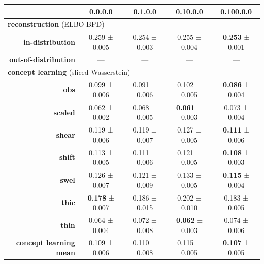 \begin{tabular}{rcccc}
\toprule
& \textbf{0.0.0.0} & \textbf{0.1.0.0} & \textbf{0.10.0.0} & \textbf{0.100.0.0} \\
\midrule
\multicolumn{ 5 }{l}{\textbf{reconstruction}  (ELBO BPD)} \\
\midrule
\textbf{in-distribution} & 0.259 ± 0.005 & 0.254 ± 0.003 & 0.255 ± 0.004 & \textbf{0.253} ± 0.001 \\
\textbf{out-of-distribution} & --- & --- & --- & --- \\
\midrule
\multicolumn{ 5 }{l}{\textbf{concept learning}  (sliced Wasserstein)} \\
\midrule
\textbf{obs} & 0.099 ± 0.006 & 0.091 ± 0.006 & 0.102 ± 0.005 & \textbf{0.086} ± 0.004 \\
\textbf{scaled} & 0.062 ± 0.002 & 0.068 ± 0.005 & \textbf{0.061} ± 0.003 & 0.073 ± 0.004 \\
\textbf{shear} & 0.119 ± 0.006 & 0.119 ± 0.007 & 0.127 ± 0.005 & \textbf{0.111} ± 0.006 \\
\textbf{shift} & 0.113 ± 0.005 & 0.111 ± 0.006 & 0.121 ± 0.005 & \textbf{0.108} ± 0.003 \\
\textbf{swel} & 0.126 ± 0.007 & 0.121 ± 0.009 & 0.133 ± 0.005 & \textbf{0.115} ± 0.004 \\
\textbf{thic} & \textbf{0.178} ± 0.007 & 0.186 ± 0.015 & 0.202 ± 0.010 & 0.183 ± 0.005 \\
\textbf{thin} & 0.064 ± 0.004 & 0.072 ± 0.008 & \textbf{0.062} ± 0.003 & 0.074 ± 0.006 \\
\addlinespace
\textbf{concept learning mean} & 0.109 ± 0.006 & 0.110 ± 0.008 & 0.115 ± 0.005 & \textbf{0.107} ± 0.005 \\
\midrule
\bottomrule
\end{tabular}